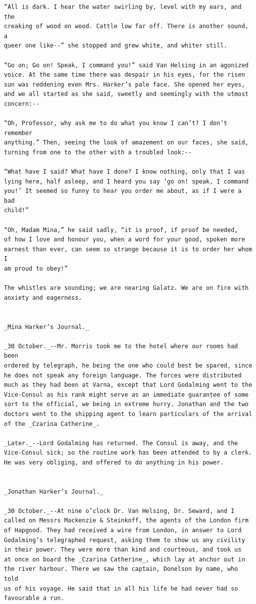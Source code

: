 \documentclass{article}
\begin{document}
\begin{verbatim}
“All is dark. I hear the water swirling by, level with my ears, and the
creaking of wood on wood. Cattle low far off. There is another sound, a
queer one like--” she stopped and grew white, and whiter still.

“Go on; Go on! Speak, I command you!” said Van Helsing in an agonized
voice. At the same time there was despair in his eyes, for the risen
sun was reddening even Mrs. Harker’s pale face. She opened her eyes,
and we all started as she said, sweetly and seemingly with the utmost
concern:--

“Oh, Professor, why ask me to do what you know I can’t? I don’t remember
anything.” Then, seeing the look of amazement on our faces, she said,
turning from one to the other with a troubled look:--

“What have I said? What have I done? I know nothing, only that I was
lying here, half asleep, and I heard you say ‘go on! speak, I command
you!’ It seemed so funny to hear you order me about, as if I were a bad
child!”

“Oh, Madam Mina,” he said sadly, “it is proof, if proof be needed,
of how I love and honour you, when a word for your good, spoken more
earnest than ever, can seem so strange because it is to order her whom I
am proud to obey!”

The whistles are sounding; we are nearing Galatz. We are on fire with
anxiety and eagerness.


_Mina Harker’s Journal._

_30 October._--Mr. Morris took me to the hotel where our rooms had been
ordered by telegraph, he being the one who could best be spared, since
he does not speak any foreign language. The forces were distributed
much as they had been at Varna, except that Lord Godalming went to the
Vice-Consul as his rank might serve as an immediate guarantee of some
sort to the official, we being in extreme hurry. Jonathan and the two
doctors went to the shipping agent to learn particulars of the arrival
of the _Czarina Catherine_.

_Later._--Lord Godalming has returned. The Consul is away, and the
Vice-Consul sick; so the routine work has been attended to by a clerk.
He was very obliging, and offered to do anything in his power.


_Jonathan Harker’s Journal._

_30 October._--At nine o’clock Dr. Van Helsing, Dr. Seward, and I
called on Messrs Mackenzie & Steinkoff, the agents of the London firm
of Hapgood. They had received a wire from London, in answer to Lord
Godalming’s telegraphed request, asking them to show us any civility
in their power. They were more than kind and courteous, and took us
at once on board the _Czarina Catherine_, which lay at anchor out in
the river harbour. There we saw the captain, Donelson by name, who told
us of his voyage. He said that in all his life he had never had so
favourable a run.


\end{verbatim}
\end{document}
